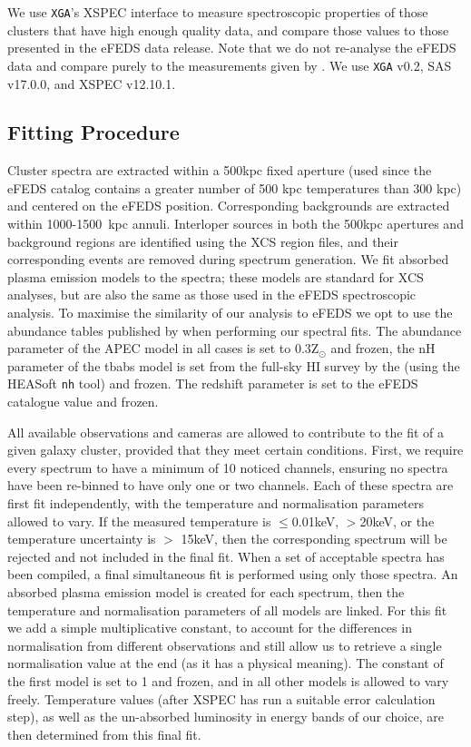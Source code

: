 \documentclass[fleqn,usenatbib]{mnras}
\begin{document}
We use \texttt{XGA}'s XSPEC \citep[][]{xspec} interface to measure spectroscopic properties of those clusters that have high enough quality data, and compare those values to those presented in the eFEDS data release. Note that we do not re-analyse the eFEDS data and compare purely to the measurements given by \cite{efedsclustercat}. We use \texttt{XGA} v0.2, SAS v17.0.0, and XSPEC v12.10.1.

\subsection{Fitting Procedure}
\label{subsec:fitproc}

Cluster spectra are extracted within a 500kpc fixed aperture (used since the eFEDS catalog contains a greater number of 500 kpc temperatures than 300 kpc) and centered on the eFEDS position.  Corresponding backgrounds are extracted within 1000-1500~kpc annuli.  Interloper sources in both the 500kpc apertures and background regions are identified using the XCS region files, and their corresponding events are removed during spectrum generation.  We fit absorbed \cite[with tbabs, ][]{tbabs} plasma emission models \citep[APEC, ][]{apec} to the spectra; these models are standard for XCS analyses, but are also the same as those used in the eFEDS spectroscopic analysis. To maximise the similarity of our analysis to eFEDS we opt to use the abundance tables published by \cite{aspl} when performing our spectral fits. The abundance parameter of the APEC model in all cases is set to 0.3Z$_{\odot}$ and frozen, the nH parameter of the tbabs model is set from the full-sky HI survey by the \cite{nh} (using the HEASoft \texttt{nh} tool) and frozen. The redshift parameter is set to the eFEDS catalogue value and frozen.

All available observations and cameras are allowed to contribute to the fit of a given galaxy cluster, provided that they meet certain conditions. First, we require every spectrum to have a minimum of 10 noticed channels, ensuring no spectra have been re-binned to have only one or two channels. Each of these spectra are first fit independently, with the temperature and normalisation parameters allowed to vary.  If the measured temperature is $\leq$0.01keV, $>$20keV, or the temperature uncertainty is $>$ 15keV, then the corresponding spectrum will be rejected and not included in the final fit. When a set of acceptable spectra has been compiled, a final simultaneous fit is performed using only those spectra. An absorbed plasma emission model is created for each spectrum, then the temperature and normalisation parameters of all models are linked.  For this fit we add a simple multiplicative constant, to account for the differences in normalisation from different observations and still allow us to retrieve a single normalisation value at the end (as it has a physical meaning). The constant of the first model is set to 1 and frozen, and in all other models is allowed to vary freely.  Temperature values (after XSPEC has run a suitable error calculation step), as well as the un-absorbed luminosity in energy bands of our choice, are then determined from this final fit.
\end{document}
